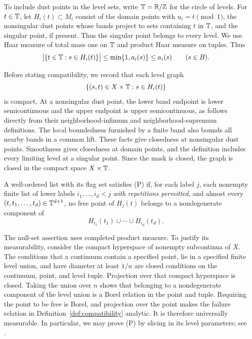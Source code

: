 To include dust points in the level sets, write $\mathbb T=\mathbb R/\mathbb Z$ for the
circle of levels.  For $t\in\mathbb T$, let $H_i(t)\subset M_i$ consist of
the domain points with $u_i=t\pmod{1}$, the nonsingular dust points
whose bands project to sets containing $t$ in $\mathbb T$, and the singular
point, if present.  Thus the singular point belongs to every level.
We use Haar measure of total mass one on $\mathbb T$ and product Haar
measure on tuples.  Thus
\begin{equation}\label{eq:band-incidence}
 \bigl|\{t\in\mathbb T:s\in H_i(t)\}\bigr|
 \le \min\{1,a_i(s)\}\le a_i(s)
 \qquad(s\in B).
\end{equation}

Before stating compatibility, we record that each level graph
\[
 \{(s,t)\in X\times\mathbb T:s\in H_i(t)\}
\]
is compact.  At a nonsingular dust point, the lower band endpoint is
lower semicontinuous and the upper endpoint is upper semicontinuous,
as follows directly from their neighborhood-infimum and
neighborhood-supremum definitions.  The local boundedness furnished
by a finite band also bounds all nearby bands in a common lift.
These facts give closedness at nonsingular dust points.  Smoothness
gives closedness at domain points, and the definition includes every
limiting level at a singular point.  Since the mask is closed, the
graph is closed in the compact space $X\times\mathbb T$.

\begin{definition}[Compatibility]\label{def:compatibility}
A well-ordered list with its flag set satisfies \textup{(P)} if, for
each label $j$, each nonempty finite list of lower labels
$i_1,\ldots,i_d<j$ \emph{with repetitions permitted}, and almost every
$(t,t_1,\ldots,t_d)\in\mathbb T^{d+1}$, no free point of $H_j(t)$ belongs
to a nondegenerate component of
\[
 H_{i_1}(t_1)\cup\cdots\cup H_{i_d}(t_d).
\tag{P}
\]
\end{definition}

The null-set assertion uses completed product measure.  To justify
its measurability, consider the compact hyperspace of nonempty
subcontinua of $X$.  The conditions that a continuum contain a
specified point, lie in a specified finite level
union, and have diameter at least $1/n$ are closed conditions on the
continuum, point, and level tuple.  Projection over that compact
hyperspace is closed.  Taking the union over $n$ shows that belonging
to a nondegenerate component of the level union is a Borel relation
in the point and tuple.  Requiring the point to be free is Borel, and
projection over the point makes the failure relation in
Definition~\ref{def:compatibility} analytic.  It is therefore
universally measurable.  In particular, we may prove \textup{(P)} by
slicing in its level parameters; see \cite{Kechris1995}.

